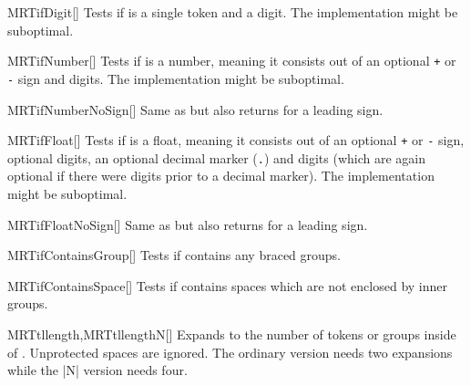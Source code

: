\begin{describemacroTF}[G,N,GN]{MRTifDigit}[]
  Tests if  is a single token and a digit. The implementation might be
  suboptimal.
\end{describemacroTF}

\begin{describemacroTF}[G,N,GN]{MRTifNumber}[]
  Tests if  is a number, meaning it consists out of an optional
  \texttt{+} or \texttt{-} sign and digits. The implementation might be
  suboptimal.
\end{describemacroTF}

\begin{describemacroTF}[G,N,GN]{MRTifNumberNoSign}[]
  Same as  but also returns  for a leading sign.
\end{describemacroTF}

\begin{describemacroTF}[G,N,GN]{MRTifFloat}[]
  Tests if  is a float, meaning it consists out of an optional
  \texttt{+} or \texttt{-} sign, optional digits, an optional decimal marker
  (\texttt{.}) and digits (which are again optional if there were digits prior
  to a decimal marker). The implementation might be suboptimal.
\end{describemacroTF}

\begin{describemacroTF}[G,N,GN]{MRTifFloatNoSign}[]
  Same as  but also returns  for a leading sign.
\end{describemacroTF}

\begin{describemacroTF}[G,N,GN]{MRTifContainsGroup}[]
  Tests if  contains any braced groups.
\end{describemacroTF}

\begin{describemacroTF}[G,N,GN]{MRTifContainsSpace}[]
  Tests if  contains spaces which are not enclosed by inner groups.
\end{describemacroTF}

\begin{describemacro}{MRTtllength,MRTtllengthN}[]
  Expands to the number of tokens or groups inside of . Unprotected
  spaces are ignored. The ordinary version needs two expansions while the |N|
  version needs four.
\end{describemacro}

